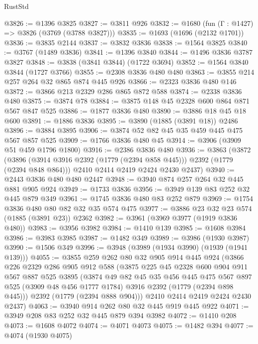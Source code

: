 \begin{lexlean}{RustStd}
\begin{coremodule}
@3826 := @1396 @3825
@3827 := @3811 @926
@3832 := @1680 (fun (Γ : @1427) => @3826 (@3769 (@3788 @3827)))
@3835 := @1693 (@1696 (@2132 @1701))
@3836 := @3835 @2144
@3837 := @3832 @3836
@3838 := @1564 @3825
@3840 := @3767 (@1489 @3836)
@3841 := @1396 @3840
@3844 := @1496 @3836 @3787 @3827
@3848 := @3838 (@3841 @3844) (@1722 @3694)
@3852 := @1564 @3840 @3844 (@1727 @3766)
@3855 := @2308 @3836 @480 @480
@3863 := @3855 @214 @257 @264 @32 @865 @874 @445 @926
@3866 := @2323 @3836 @480 @146
@3872 := @3866 @213 @2329 @286 @865 @872 @588
@3874 := @2338 @3836 @480
@3875 := @3874 @78
@3884 := @3875 @148 @45 @2328 @600 @864 @871 @567 @847 @525
@3886 := @1877 @3836 @480
@3890 := @3886 @18 @45 @18 @600
@3891 := @1886 @3836
@3895 := @3890 (@1885 (@3891 @18)) @2486
@3896 := @3884 @3895
@3906 := @3874 @52 @82 @45 @35 @459 @445 @475 @567 @857 @525
@3909 := @1766 @3836 @480 @45
@3914 := @3906 (@3909 @51 @459 @1796 @1800)
@3916 := @2386 @3836 @480
@3936 := @3863
    (@3872
      (@3896 (@3914 @3916 @2392 (@1779 (@2394 @858 @445))) @2392 (@1779 (@2394 @848 @864)))
      @2410
      @2414
      @2419
      @2424
      @2430
      @2437)
@3940 := @2443 @3836 @480 @480 @2447
@3948 := @3940 @874 @257 @264 @32 @445 @881 @905 @924
@3949 := @1733 @3836
@3956 := @3949 @139 @83 @252 @32 @445 @879 @349
@3961 := @1745 @3836 @480 @83 @252 @879
@3969 := @1754 @3836 @480 @80 @82 @32 @35 @574 @475
@3977 := @3886 @23 @32 @23 @574 (@1885 (@3891 @23)) @2362
@3982 := @3961 (@3969 @3977 (@1919 @3836 @480))
@3983 := @3956 @3982
@3984 := @1410 @139
@3985 := @1608 @3984
@3986 := @3983 @3985
@3987 := @1482 @349
@3989 := @3986 (@1930 @3987)
@3990 := @1506 @349
@3996 := @3948 (@3989 (@1934 @3990) (@1939 (@1941 @139)))
@4055 := @3855
    @259
    @262
    @80
    @32
    @905
    @914
    @445
    @924
    (@3866
      @226
      @2329
      @286
      @905
      @912
      @588
      (@3875
        @225
        @45
        @2328
        @600
        @904
        @911
        @567
        @887
        @525
        @3895
        (@3874
          @49
          @82
          @45
          @35
          @456
          @445
          @475
          @567
          @897
          @525
          (@3909 @48 @456 @1777 @1784)
          @3916
          @2392
          (@1779 (@2394 @898 @445)))
        @2392
        (@1779 (@2394 @888 @904)))
      @2410
      @2414
      @2419
      @2424
      @2430
      @2437)
@4063 := @3940 @914 @262 @80 @32 @445 @919 @445 @922
@4071 := @3949 @208 @83 @252 @32 @445 @879 @394 @3982
@4072 := @1410 @208
@4073 := @1608 @4072
@4074 := @4071 @4073
@4075 := @1482 @394
@4077 := @4074 (@1930 @4075)

\end{coremodule}
\end{lexlean}
